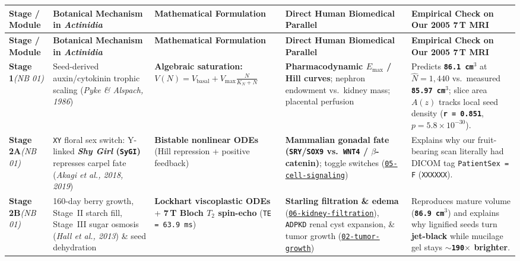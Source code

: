 \documentclass[10pt,a4paper]{article}
\newcommand{\ghblob}{https://github.com/arvidl/BMED365-2027/blob/main}
\begin{document}
{\footnotesize
\renewcommand{\arraystretch}{1.18}
\begin{xltabular}{\textwidth}{L{1.85cm} L{3.3cm} L{3.55cm} L{3.7cm} Y}
\toprule
{}\textbf{Stage / Module} & \textbf{Botanical Mechanism in \textit{Actinidia}} & \textbf{Mathematical Formulation} & \textbf{Direct Human Biomedical Parallel} & \textbf{Empirical Check on Our 2005 7\,T MRI} \\
\midrule
\endfirsthead
\toprule
{}\textbf{Stage / Module} & \textbf{Botanical Mechanism in \textit{Actinidia}} & \textbf{Mathematical Formulation} & \textbf{Direct Human Biomedical Parallel} & \textbf{Empirical Check on Our 2005 7\,T MRI} \\
\midrule
\endhead
\bottomrule
\endfoot
\textbf{Stage 1}\newline \textit{(NB 01)} &
Seed-derived auxin/cytokinin trophic scaling (\textit{Pyke \& Alspach, 1986}) &
\textbf{Algebraic saturation:} $V(N) = V_{\text{basal}} + V_{\max}\frac{N}{K_N + N}$ &
\textbf{Pharmacodynamic $E_{\max}$ / Hill curves}; nephron endowment vs.\ kidney mass; placental perfusion &
Predicts \textbf{\texttt{86.1\,cm$^3$}} at $\hat{N}=1{,}440$ vs.\ measured \textbf{\texttt{85.97\,cm$^3$}}; slice area $A(z)$ tracks local seed density (\textbf{\texttt{r = 0.851}}, $p = 5.8\times 10^{-30}$). \\

\textbf{Stage 2A}\newline \textit{(NB 01)} &
\texttt{XY} floral sex switch: Y-linked \textbf{\textit{Shy Girl} (\texttt{SyGI})} represses carpel fate (\textit{Akagi et al., 2018, 2019}) &
\textbf{Bistable nonlinear ODEs} (Hill repression + positive feedback) &
\textbf{Mammalian gonadal fate (\texttt{SRY}/\texttt{SOX9} vs.\ \texttt{WNT4} / $\beta$-catenin)}; toggle switches (\href{\ghblob/Lab5-Comp-Mod/notebooks/05-cell-signaling.ipynb}{\texttt{05-cell-signaling}}) &
Explains why our fruit-bearing scan literally had DICOM tag \texttt{PatientSex = F} (\texttt{XXXXXX}). \\

\textbf{Stage 2B}\newline \textit{(NB 01)} &
160-day berry growth, Stage~II starch fill, Stage~III sugar osmosis (\textit{Hall et al., 2013}) \& seed dehydration &
\textbf{Lockhart viscoplastic ODEs} + \textbf{7\,T Bloch $T_2$ spin-echo} (\texttt{TE = 63.9\,ms}) &
\textbf{Starling filtration \& edema} (\href{\ghblob/Lab5-Comp-Mod/notebooks/06-kidney-filtration.ipynb}{\texttt{06-kidney-filtration}}), \texttt{ADPKD} renal cyst expansion, \& tumor growth (\href{\ghblob/Lab5-Comp-Mod/notebooks/02-tumor-growth.ipynb}{\texttt{02-tumor-growth}}) &
Reproduces mature volume (\textbf{\texttt{86.9\,cm$^3$}}) and explains why lignified seeds turn \textbf{jet-black} while mucilage gel stays \textbf{\texttt{$\sim$190$\times$} brighter}. \\


\end{xltabular}}
\end{document}
